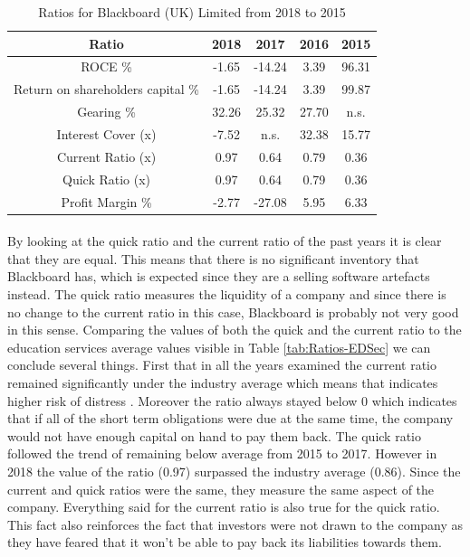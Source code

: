 \documentclass[]{article}
\begin{document}
\begin{table}
\centering
\begin{tabular}{||c | c | c | c | c||} 
\hline
Ratio & 2018 & 2017 & 2016 & 2015 \\ [0.5ex] 
\hline\hline
ROCE \% & -1.65 & -14.24 & 3.39 & 96.31 \\ 
\hline
Return on shareholders capital \% & -1.65 & -14.24 & 3.39 & 99.87 \\ 
\hline
Gearing \% & 32.26 & 25.32 & 27.70 & n.s. \\ 
\hline
Interest Cover (x) & -7.52 & n.s. & 32.38 & 15.77 \\ 
\hline
Current Ratio (x) & 0.97 & 0.64 & 0.79 & 0.36	 \\ 
\hline
Quick Ratio (x) & 0.97 & 0.64 & 0.79 & 0.36 \\ 
\hline
Profit Margin \% & -2.77 & -27.08 & 5.95 & 6.33 \\ 
\hline
\end{tabular}
\caption{Ratios for Blackboard (UK) Limited from 2018 to 2015 \cite{FAME-Blackboard}}
\label{tab:Ratios-BB}
\end{table}


\paragraph{}
By looking at the quick ratio and the current ratio of the past years it is clear that they are equal. This means that there is no significant inventory that Blackboard has, which is expected since they are a selling software artefacts instead. The quick ratio measures the liquidity of a company and since there is no change to the current ratio in this case, Blackboard is probably not very good in this sense. Comparing the values of both the quick and the current ratio to the education services average values \cite{Ready-Ratios-Education} visible in Table \ref{tab:Ratios-EDSec} we can conclude several things. First that in all the years examined the current ratio remained significantly under the industry average which means that indicates higher risk of distress \cite{Investopedia-Current}. Moreover the ratio always stayed below 0 which indicates that if all of the short term obligations were due at the same time, the company would not have enough capital on hand to pay them back. The quick ratio followed the trend of remaining below average from 2015 to 2017. However in 2018 the value of the ratio (0.97) surpassed the industry average (0.86). Since the current and quick ratios were the same, they measure the same aspect of the company. Everything said for the current ratio is also true for the quick ratio. This fact also reinforces the fact that investors were not drawn to the company as they have feared that it won't be able to pay back its liabilities towards them.
\end{document}
